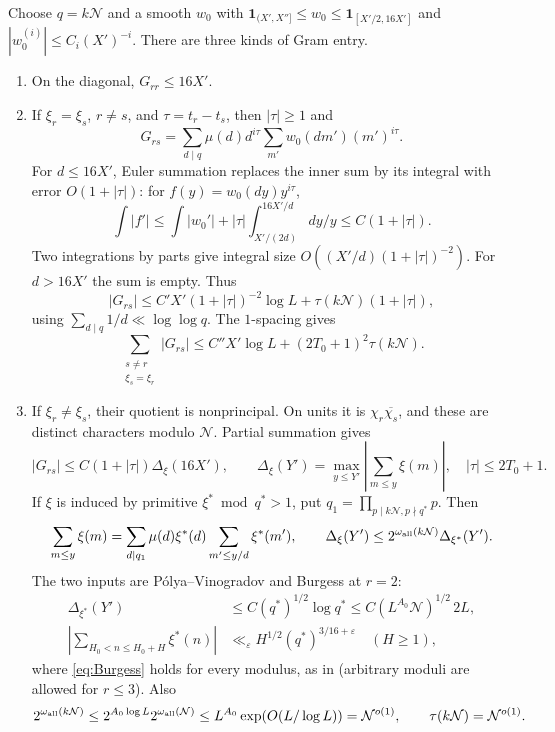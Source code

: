 \documentclass[11pt]{article}
\theoremstyle{definition}
\newcommand{\ind}{\mathbf 1}
\newcommand{\GN}{\mathcal N}
\theoremstyle{remark}
\numberwithin{equation}{section}
\begin{document}
Choose $q=k\GN$ and a smooth $w_0$ with
$\ind_{(X',X'']}\le w_0\le\ind_{[X'/2,16X']}$ and
$|w_0^{(i)}|\le C_i(X')^{-i}$. There are three kinds of Gram entry.
\begin{enumerate}
\item On the diagonal, $G_{rr}\le16X'$.
\item If $\xi_r=\xi_s$, $r\ne s$, and $\tau=t_r-t_s$, then
$|\tau|\ge1$ and
\begin{equation}\label{eq:Gram-same}
 G_{rs}=\sum_{d\mid q}\mu(d)d^{i\tau}
              \sum_{m'}w_0(dm')(m')^{i\tau}.
\end{equation}
For $d\le16X'$, Euler summation replaces the inner sum by its
integral with error $O(1+|\tau|)$: for
$f(y)=w_0(dy)y^{i\tau}$,
\[
 \int|f'|\le\int|w_0'|
       +|\tau|\int_{X'/(2d)}^{16X'/d}dy/y\le C(1+|\tau|).
\]
Two integrations by parts give integral size
$O((X'/d)(1+|\tau|)^{-2})$.
For $d>16X'$ the sum is empty. Thus
\begin{equation}\label{eq:Gram-same-bound}
 |G_{rs}|\le C'X'(1+|\tau|)^{-2}\log L
                +\tau(k\GN)(1+|\tau|),
\end{equation}
using $\sum_{d\mid q}1/d\ll\log\log q$.
The $1$-spacing gives
\begin{equation}\label{eq:Gram-same-row}
 \sum_{\substack{s\ne r\\\xi_s=\xi_r}}|G_{rs}|
 \le C''X'\log L+(2T_0+1)^2\tau(k\GN).
\end{equation}
\item If $\xi_r\ne\xi_s$, their quotient is nonprincipal.
On units it is $\chi_r\overline{\chi_s}$, and these are distinct
characters modulo $\GN$.
Partial summation gives
\begin{equation}\label{eq:Gram-distinct}
 |G_{rs}|\le C(1+|\tau|)\Delta_\xi(16X'),\qquad
 \Delta_\xi(Y')=\max_{y\le Y'}\left|\sum_{m\le y}\xi(m)\right|,
 \quad |\tau|\le2T_0+1.
\end{equation}
If $\xi$ is induced by primitive $\xi^*\bmod q^*>1$, put
$q_1=\prod_{p\mid k\GN,p\nmid q^*}p$. Then
\begin{equation}\label{eq:imprimitive}
 \sum_{m\le y}\xi(m)
 =\sum_{d\mid q_1}\mu(d)\xi^*(d)\sum_{m'\le y/d}\xi^*(m'),
 \qquad \Delta_\xi(Y')\le2^{\omega_{\rm all}(k\GN)}\Delta_{\xi^*}(Y').
\end{equation}
The two inputs are P\'olya--Vinogradov and Burgess at $r=2$:
\begin{align}
 \Delta_{\xi^*}(Y')&\le C(q^*)^{1/2}\log q^*
       \le C(L^{A_0}\GN)^{1/2}\,2L,\label{eq:PV}\\
 \left|\sum_{H_0<n\le H_0+H}\xi^*(n)\right|
   &\ll_\varepsilon H^{1/2}(q^*)^{3/16+\varepsilon}
       \quad(H\ge1),\label{eq:Burgess}
 \end{align}
where \eqref{eq:Burgess} holds for every modulus, as in
\cite[introduction, (1)]{HeathBrown2012} (arbitrary moduli are
allowed for $r\le3$).
Also
\[
 2^{\omega_{\rm all}(k\GN)}
 \le2^{A_0\log L}2^{\omega_{\rm all}(\GN)}
 \le L^{A_0}\exp(O(L/\log L))=\GN^{o(1)},\qquad
 \tau(k\GN)=\GN^{o(1)}.
\]
\end{enumerate}
\end{document}
